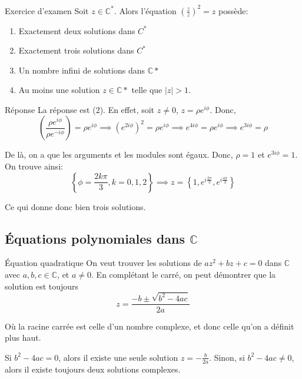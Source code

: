\documentclass[a4paper]{article}
\begin{document}
\begin{parag}{Exercice d'examen}
    Soit $z \in \mathbb{C}^*$. Alors l'équation $\left(\frac{z}{\bar{z}}\right)^2 = z$ possède:
    \begin{enumerate}
        \item Exactement deux solutions dans $C^*$
        \item Exactement trois solutions dans $C^*$
        \item Un nombre infini de solutions dans $\mathbb{C}*$
        \item Au moins une solution $z \in \mathbb{C}*$ telle que $\left|z\right| > 1$.
    \end{enumerate}

    \begin{subparag}{Réponse}
        La réponse est (2). En effet, soit $z \neq 0$, $z = \rho e^{i\phi}$. Donc,
        \[\left(\frac{\rho e^{i\phi}}{\rho e^{-i\phi}}\right) = \rho e^{i\phi} \implies \left(e^{2i\phi}\right)^2 = \rho e^{i\phi} \implies e^{4i\phi} = \rho e^{i\phi} \implies e^{3i\phi} = \rho\]

        De là, on a que les arguments et les modules sont égaux. Donc, $\rho = 1$ et $e^{3i\phi} = 1$. On trouve ainsi:
        \[\left\{\phi = \frac{2k\pi}{3}, k = 0, 1, 2\right\} \implies z = \left\{1, e^{i \frac{2\pi}{3}}, e^{i \frac{4\pi}{3}}\right\}\]

        Ce qui donne donc bien trois solutions.
    \end{subparag}
\end{parag}

\subsection{Équations polynomiales dans $\mathbb{C}$}

\begin{parag}{Équation quadratique}
    On veut trouver les solutions de $az^2 + bz + c = 0$ dans $\mathbb{C}$ avec $a, b, c \in \mathbb{C}$, et $a \neq 0$. En complétant le carré, on peut démontrer que la solution est toujours
    \[z = \frac{-b \pm \sqrt{b^2 - 4ac}}{2a}\]

    Où la racine carrée est celle d'un nombre complexe, et donc celle qu'on a définit plus haut.

    Si $b^2 - 4ac = 0$, alors il existe une seule solution $z = -\frac{b}{2a}$. Sinon, si $b^2 - 4ac \neq 0$, alors il existe toujours deux solutions complexes.
\end{parag}
\end{document}
